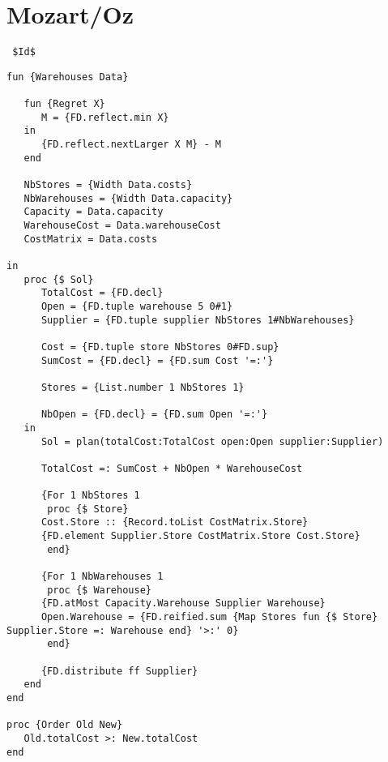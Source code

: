 \section{Mozart/Oz}
\verb= $Id$ =

\begin{lstlisting}[language=Oz]
fun {Warehouses Data}
   
   fun {Regret X}
      M = {FD.reflect.min X}
   in
      {FD.reflect.nextLarger X M} - M
   end

   NbStores = {Width Data.costs}
   NbWarehouses = {Width Data.capacity}
   Capacity = Data.capacity
   WarehouseCost = Data.warehouseCost
   CostMatrix = Data.costs
   
in
   proc {$ Sol}
      TotalCost = {FD.decl}
      Open = {FD.tuple warehouse 5 0#1}
      Supplier = {FD.tuple supplier NbStores 1#NbWarehouses}

      Cost = {FD.tuple store NbStores 0#FD.sup}
      SumCost = {FD.decl} = {FD.sum Cost '=:'}

      Stores = {List.number 1 NbStores 1}

      NbOpen = {FD.decl} = {FD.sum Open '=:'}
   in
      Sol = plan(totalCost:TotalCost open:Open supplier:Supplier)

      TotalCost =: SumCost + NbOpen * WarehouseCost

      {For 1 NbStores 1
       proc {$ Store}
	  Cost.Store :: {Record.toList CostMatrix.Store}
	  {FD.element Supplier.Store CostMatrix.Store Cost.Store}
       end}

      {For 1 NbWarehouses 1
       proc {$ Warehouse}
	  {FD.atMost Capacity.Warehouse Supplier Warehouse}
	  Open.Warehouse = {FD.reified.sum {Map Stores fun {$ Store} Supplier.Store =: Warehouse end} '>:' 0}
       end}
      
      {FD.distribute ff Supplier}
   end
end

proc {Order Old New}
   Old.totalCost >: New.totalCost
end
\end{lstlisting}
